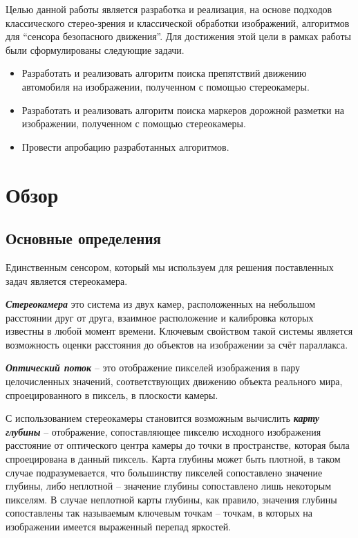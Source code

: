 \documentclass[aps,%
14pt,%
final,%
oneside,
onecolumn,%
musixtex, %
superscriptaddress,%
centertags]{extarticle} %
\begin{document}
Целью данной работы является разработка и реализация, на основе подходов классического стерео-зрения и классической обработки изображений, алгоритмов для ``сенсора безопасного движения''.
Для достижения этой цели в рамках работы были сформулированы следующие задачи.
\begin{itemize}
    \item Разработать и реализовать алгоритм поиска препятствий движению автомобиля на изображении, полученном с помощью стереокамеры.
    \item Разработать и реализовать алгоритм поиска маркеров дорожной разметки на изображении, полученном с помощью стереокамеры.
    \item Провести апробацию разработанных алгоритмов.
\end{itemize}

\newpage

\section{Обзор}

\subsection{Основные определения}

Единственным сенсором, который мы используем для решения поставленных задач является стереокамера.

\textbf{\textit{Стереокамера}} это система из двух камер, расположенных на небольшом расстоянии друг от друга, взаимное расположение и калибровка которых известны в любой момент времени. Ключевым свойством такой системы является возможность оценки расстояния до объектов на изображении за счёт параллакса.

\textbf{\textit{Оптический поток}} -- это отображение пикселей изображения в пару целочисленных значений, соответствующих движению объекта реального мира, спроецированного в пиксель, в плоскости камеры.

С использованием стереокамеры становится возможным вычислить \textbf{\textit{карту глубины}} -- отображение, сопоставляющее пикселю исходного изображения расстояние от оптического центра камеры до точки в пространстве, которая была спроецирована в данный пиксель. Карта глубины может быть плотной, в таком случае подразумевается, что большинству пикселей сопоставлено значение глубины, либо неплотной -- значение глубины сопоставлено лишь некоторым пикселям. В случае неплотной карты глубины, как правило, значения глубины сопоставлены так называемым ключевым точкам -- точкам, в которых на изображении имеется выраженный перепад яркостей.
\end{document}
